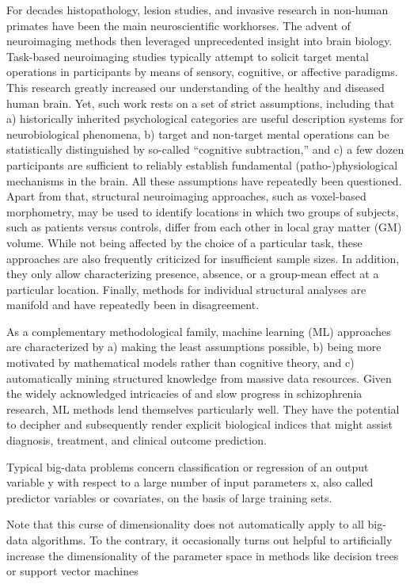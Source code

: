 \documentclass[authoryear,review,3p]{elsarticle}
\begin{document}
For decades histopathology, lesion studies, and invasive research in non-human primates have been the main neuroscientific workhorses. The advent of neuroimaging methods then leveraged unprecedented insight into brain biology. Task-based neuroimaging studies typically attempt to solicit target mental operations in participants by means of sensory, cognitive, or affective paradigms. This research greatly increased our understanding of the healthy and diseased human brain. Yet, such work rests on a set of strict assumptions, including that a) historically inherited psychological categories are useful description systems for neurobiological phenomena, b) target and non-target mental operations can be statistically distinguished by so-called “cognitive subtraction,” and c) a few dozen participants are sufficient to reliably establish fundamental (patho-)physiological mechanisms in the brain. All these assumptions have repeatedly been questioned. Apart from that, structural neuroimaging approaches, such as voxel-based morphometry, may be used to identify locations in which two groups of subjects, such as patients versus controls, differ from each other in local gray matter (GM) volume. While not being affected by the choice of a particular task, these approaches are also frequently criticized for insufficient sample sizes. In addition, they only allow characterizing presence, absence, or a group-mean effect at a particular location. Finally, methods for individual structural analyses are manifold and have repeatedly been in disagreement.

As a complementary methodological family, machine learning (ML) approaches are characterized by a) making the least assumptions possible, b) being more motivated by mathematical models rather than cognitive theory, and c) automatically mining structured knowledge from massive data resources. Given the widely acknowledged intricacies of and slow progress in schizophrenia research, ML methods lend themselves particularly well. They have the potential to decipher and subsequently render explicit biological indices that might assist diagnosis, treatment, and clinical outcome prediction.


Typical big-data problems concern classification or regression of an output variable y with respect to a large number of input parameters x, also called predictor variables or covariates, on the basis of large training sets. 


Note that this curse of dimensionality does not automatically apply to all big-data algorithms. To the contrary, it occasionally turns out helpful to artificially increase the dimensionality of the parameter space in methods like decision trees or support vector machines 
\end{document}
